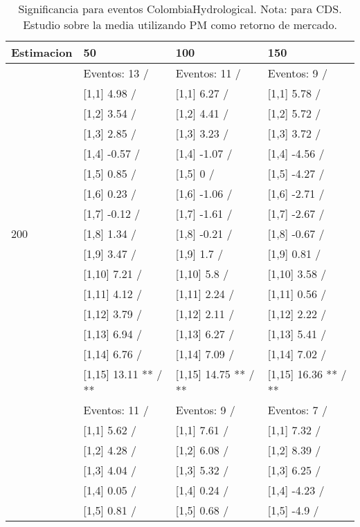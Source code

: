 \begin{table}

\caption{Significancia para eventos ColombiaHydrological. Nota: para CDS. Estudio sobre la media utilizando PM como retorno de mercado.}
\centering
\begin{tabular}[t]{llll}
\toprule
Estimacion & 50 & 100 & 150\\
\midrule
 & Eventos:  13 / & Eventos:  11 / & Eventos:  9 /\\
 & {}[1,1] 4.98  / & {}[1,1] 6.27  / & {}[1,1] 5.78  /\\
 & {}[1,2] 3.54  / & {}[1,2] 4.41  / & {}[1,2] 5.72  /\\
 & {}[1,3] 2.85  / & {}[1,3] 3.23  / & {}[1,3] 3.72  /\\
 & {}[1,4] -0.57  / & {}[1,4] -1.07  / & {}[1,4] -4.56  /\\
\addlinespace
 & {}[1,5] 0.85  / & {}[1,5] 0  / & {}[1,5] -4.27  /\\
 & {}[1,6] 0.23  / & {}[1,6] -1.06  / & {}[1,6] -2.71  /\\
 & {}[1,7] -0.12  / & {}[1,7] -1.61  / & {}[1,7] -2.67  /\\
200 & {}[1,8] 1.34  / & {}[1,8] -0.21  / & {}[1,8] -0.67  /\\
 & {}[1,9] 3.47  / & {}[1,9] 1.7  / & {}[1,9] 0.81  /\\
\addlinespace
 & {}[1,10] 7.21  / & {}[1,10] 5.8  / & {}[1,10] 3.58  /\\
 & {}[1,11] 4.12  / & {}[1,11] 2.24  / & {}[1,11] 0.56  /\\
 & {}[1,12] 3.79  / & {}[1,12] 2.11  / & {}[1,12] 2.22  /\\
 & {}[1,13] 6.94  / & {}[1,13] 6.27  / & {}[1,13] 5.41  /\\
 & {}[1,14] 6.76  / & {}[1,14] 7.09  / & {}[1,14] 7.02  /\\
\addlinespace
 & {}[1,15] 13.11 ** / ** & {}[1,15] 14.75 ** / ** & {}[1,15] 16.36 ** / **\\
 & Eventos:  11 / & Eventos:  9 / & Eventos:  7 /\\
 & {}[1,1] 5.62  / & {}[1,1] 7.61  / & {}[1,1] 7.32  /\\
 & {}[1,2] 4.28  / & {}[1,2] 6.08  / & {}[1,2] 8.39  /\\
 & {}[1,3] 4.04  / & {}[1,3] 5.32  / & {}[1,3] 6.25  /\\
\addlinespace
 & {}[1,4] 0.05  / & {}[1,4] 0.24  / & {}[1,4] -4.23  /\\
 & {}[1,5] 0.81  / & {}[1,5] 0.68  / & {}[1,5] -4.9  /\\

\end{tabular}
\end{table}
